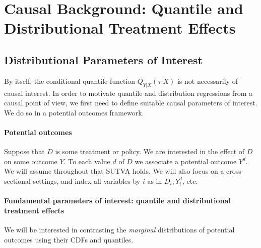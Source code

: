 \newpage 


\section{Causal Background: Quantile and Distributional Treatment Effects}
\label{quantile:section:causal_background}


\subsection{Distributional Parameters of Interest}

By itself, the conditional quantile function $Q_{Y|X}(\tau|X)$ is not necessarily of causal interest. In order to motivate quantile and distribution regressions from a causal point of view, we first need to define suitable causal parameters of interest. We do so in a potential outcomes framework. 

\paragraph{Potential outcomes}

Suppose that $D$ is some treatment or policy. We are interested in the effect of $D$ on some outcome $Y$. To each value $d$ of $D$ we associate a potential outcome $Y^d$.   
%
We will assume throughout that SUTVA holds. We will also focus on a cross-sectional settings, and index all variables by $i$ as in $D_i, Y^d_i$, etc.


 
 \paragraph{Fundamental parameters of interest:  quantile and distributional treatment effects}

We will be interested in contrasting the \emph{marginal} distributions of potential outcomes using their CDFs and quantiles.  


